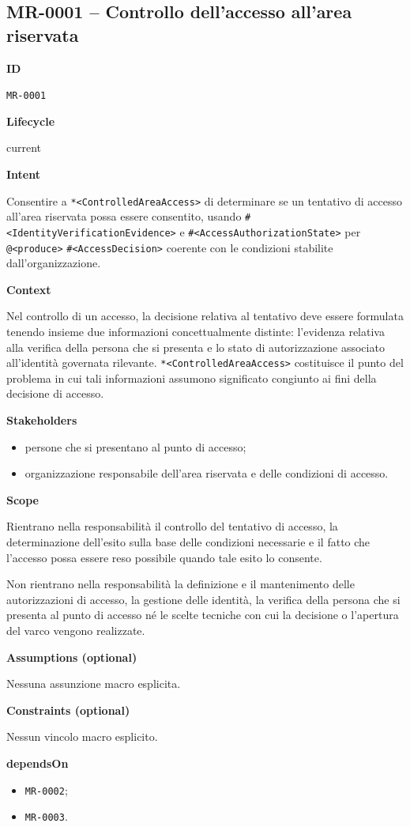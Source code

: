 \documentclass[11pt,a4paper]{article}
\makeatletter
\newcommand{\bbeh}[1]{\texttt{*<#1>}}
\newcommand{\bnon}[1]{\texttt{\#<#1>}}
\newcommand{\baop}[1]{\texttt{@<#1>}}
\newcommand{\Field}[1]{\par\medskip\noindent\textbf{#1}\par\smallskip}
\newenvironment{compactitems}{\begin{itemize}[leftmargin=1.35em,itemsep=0.1em,topsep=0.2em,parsep=0pt]}{\end{itemize}}
\makeatother
\begin{document}
\newpage

\noindent
\begin{minipage}[t]{0.64\textwidth}\small
\subsection*{MR-0001 -- Controllo dell'accesso all'area riservata}

\Field{ID} \texttt{MR-0001}

\Field{Lifecycle} current

\Field{Intent}
Consentire a \bbeh{ControlledAreaAccess} di determinare se un tentativo di accesso all'area riservata possa essere consentito, usando \bnon{IdentityVerificationEvidence} e \bnon{AccessAuthorizationState} per \baop{produce} \bnon{AccessDecision} coerente con le condizioni stabilite dall'organizzazione.

\Field{Context}
Nel controllo di un accesso, la decisione relativa al tentativo deve essere formulata tenendo insieme due informazioni concettualmente distinte: l'evidenza relativa alla verifica della persona che si presenta e lo stato di autorizzazione associato all'identit\`a governata rilevante. \bbeh{ControlledAreaAccess} costituisce il punto del problema in cui tali informazioni assumono significato congiunto ai fini della decisione di accesso.

\Field{Stakeholders}
\begin{compactitems}
  \item persone che si presentano al punto di accesso;
  \item organizzazione responsabile dell'area riservata e delle condizioni di accesso.
\end{compactitems}

\Field{Scope}
Rientrano nella responsabilit\`a il controllo del tentativo di accesso, la determinazione dell'esito sulla base delle condizioni necessarie e il fatto che l'accesso possa essere reso possibile quando tale esito lo consente.

Non rientrano nella responsabilit\`a la definizione e il mantenimento delle autorizzazioni di accesso, la gestione delle identit\`a, la verifica della persona che si presenta al punto di accesso n\'e le scelte tecniche con cui la decisione o l'apertura del varco vengono realizzate.

\Field{Assumptions (optional)} Nessuna assunzione macro esplicita.

\Field{Constraints (optional)} Nessun vincolo macro esplicito.

\Field{dependsOn}
\begin{compactitems}
  \item \texttt{MR-0002};
  \item \texttt{MR-0003}.
\end{compactitems}
\end{minipage}\hfill
\end{document}
